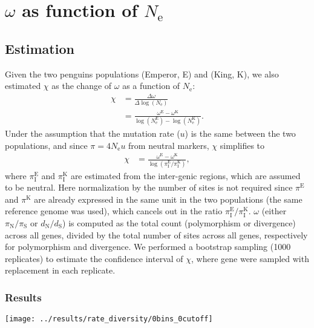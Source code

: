 \documentclass[10pt]{article}
\newcommand{\Ne}{N_{\text{e}}}
\newcommand{\dn}{d_{\text{N}}}
\newcommand{\ds}{d_{\text{S}}}
\newcommand{\dnds}{\dn / \ds}
\newcommand{\pin}{\pi_{\text{N}}}
\newcommand{\pis}{\pi_{\text{S}}}
\newcommand{\pinpis}{\pin / \pis}
\newcommand{\piInter}{\pi_{\text{I}}}
\begin{document}
    \section{$\omega$ as function of $\Ne$}

    \subsection{Estimation}
    Given the two penguins populations (Emperor, E) and (King, K), we also estimated $\chi$ as the change of $\omega$ as a function of $\Ne$:
    \begin{align}
        \chi & = \frac{\Delta \omega}{\Delta \log \left( \Ne \right)} \\
             & = \frac{\omega^{\text{E}} - \omega^{\text{K}}}{\log\left( \Ne^{\text{E}}\right) - \log \left(\Ne^{\text{K}}\right)}.
    \end{align}
    Under the assumption that the mutation rate ($u$) is the same between the two populations, and since $\pi = 4 \Ne u$ from neutral markers, $\chi$ simplifies to
    \begin{align}
        \chi & = \frac{\omega^{\text{E}} - \omega^{\text{K}}}{\log\left( \piInter^{\text{E}} / \piInter^{\text{K}} \right)},
    \end{align}
    where $\piInter^{\text{E}}$ and $\piInter^{\text{K}}$ are estimated from the inter-genic regions, which are assumed to be neutral.
    Here normalization by the number of sites is not required since $\pi^{\text{E}}$ and $\pi^{\text{K}}$ are already expressed in the same unit in the two populations (the same reference genome was used), which cancels out in the ratio $\piInter^{\text{E}} / \piInter^{\text{K}}$.
    $\omega$ (either $\pinpis$ or $\dnds$) is computed as the total count (polymorphism or divergence) across all genes, divided by the total number of sites across all genes, respectively for polymorphism and divergence.
    We performed a bootstrap sampling (1000 replicates) to estimate the confidence interval of $\chi$, where gene were sampled with replacement in each replicate.

    \subsubsection{Results}
    \begin{center}
        \texttt{[image: ../results/rate\_diversity/0bins\_0cutoff]}
    \end{center}

    \printbibliography
\end{document}
